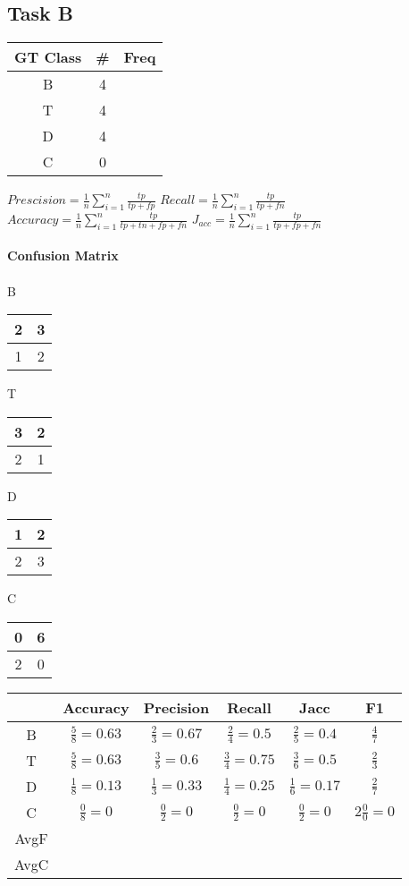 \documentclass[10pt]{article}
\begin{document}
\subsection{Task B}
\begin{center}
\begin{tabular}{ c c c }
 GT Class & \# & Freq  \\
 \hline
  B & 4  \\
 T & 4   \\
  D & 4  \\
 C & 0
\end{tabular}
\end{center}
$Prescision =\frac{1}{n}\sum_{i=1}^{n} \frac{tp}{tp+fp}$
$Recall =\frac{1}{n}\sum_{i=1}^{n} \frac{tp}{tp+fn}$
$Accuracy =\frac{1}{n}\sum_{i=1}^{n} \frac{tp}{tp+tn+fp+fn}$
$J_{acc} =\frac{1}{n}\sum_{i=1}^{n} \frac{tp}{tp+fp+fn}$
\paragraph{Confusion Matrix}
\paragraph{}
\begin{center}
B \begin{tabular}{ c| c }
 2 & 3  \\
 \hline
 1& 2
\end{tabular}
 T \begin{tabular}{ c| c }
 3 & 2  \\
 \hline
 2& 1
\end{tabular}
 D \begin{tabular}{ c| c }
 1 & 2  \\
 \hline
 2& 3
\end{tabular}
 C \begin{tabular}{ c| c }
 0 & 6  \\
 \hline
 2& 0
\end{tabular}

\begin{tabular}{ c|c|c|c|c|c }
 &Accuracy & Precision & Recall&Jacc&F1 \\
 \hline
 B & $\frac{5}{8}= 0.63$ & $\frac{2}{3}=0.67$ & $\frac{2}{4}= 0.5$ & $\frac{2}{5}= 0.4$ & $\frac{4}{7}$  \\
  \hline
 T & $\frac{5}{8} = 0.63$ & $\frac{3}{5} = 0.6$ & $\frac{3}{4} = 0.75$ & $\frac{3}{6} = 0.5$ & $\frac{2}{3}$\\
  \hline
 D & $\frac{1}{8} = 0.13$ & $\frac{1}{3}= 0.33 $ & $\frac{1}{4}=0.25 $ & $\frac{1}{6} = 0.17$ & $\frac{2}{7}$\\
  \hline
 C & $\frac{0}{8} = 0$ & $\frac{0}{2} =0$ & $\frac{0}{2} = 0$ & $\frac{0}{2}=0$ & $2\frac{0}{0} = 0$ \\
 \hline\hline
 AvgF& && & & \\
 AvgC& & & & &

\end{tabular}
\end{center}
\end{document}
